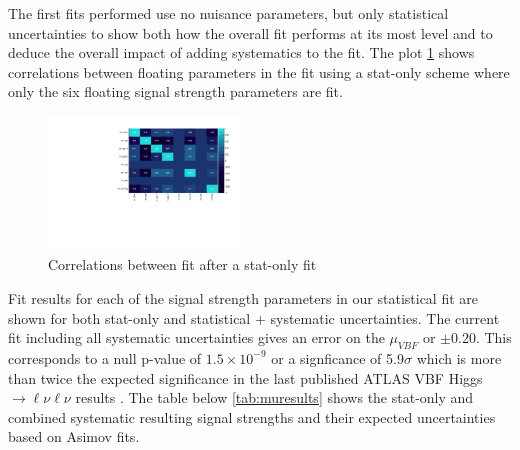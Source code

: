 The first fits performed use no nuisance parameters, but only statistical uncertainties to show both how the overall fit performs at its most level and to deduce the overall impact of adding systematics to the fit. The plot \ref{fig:correlations} shows correlations between floating parameters in the fit using a stat-only scheme where only the six floating signal strength parameters are fit.

\begin{figure}[!h]
\centering
\includegraphics[width=0.45\textwidth]{Pictures/fitresults/correlation_stat.pdf}
\caption{Correlations between fit  after a stat-only fit}
\label{fig:correlations}
\end{figure}

Fit results for each of the signal strength parameters in our statistical fit are shown for both stat-only and statistical $+$ systematic uncertainties. The current fit including all systematic uncertainties gives an error on the $\mu_{VBF}$ or $\pm 0.20$. This corresponds to a null p-value of $1.5\times10^{-9}$ or a signficance of 5.9$\sigma$ which is more than twice the expected significance in the last published ATLAS VBF Higgs $\rightarrow \ell\nu\ell\nu$ results \cite{HWWPaper}. The table below \ref{tab:muresults} shows the stat-only and combined systematic resulting signal strengths and their expected uncertainties based on Asimov fits. 

